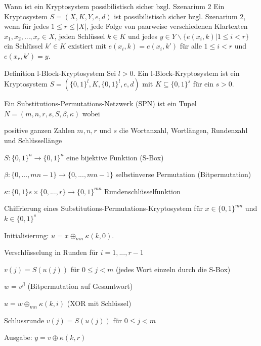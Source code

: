 \documentclass[avery5371, frame]{flashcards}
\begin{document}
\begin{flashcard}{Wann ist ein Kryptosystem possibilistisch sicher bzgl. Szenarium 2}
    Ein Kryptosystem $S=(X,K,Y,e,d)$ ist possibilistisch sicher bzgl. Szenarium 2, wenn für jedes $1 \leq r\leq |X|$, jede Folge von paarweise verschiedenen Klartexten $x_1,x_2,...,x_r\in X$, jeden Schlüssel $k\in K$ und jedes $y\in Y\backslash\{e(x_i,k)| 1 \leq i < r\}$ ein Schlüssel $k'\in K$ existiert mit $e(x_i,k)=e(x_i,k')$ für alle $1\leq i< r$ und $e(x_r,k')=y$.
\end{flashcard}

\begin{flashcard}{Definition l-Block-Kryptosystem}
    Sei $l>0$. Ein l-Block-Kryptosystem ist ein Kryptosystem $S=(\{0,1\}^l,K,\{0,1\}^l,e,d)$ mit $K\subseteq \{0,1\}^s$ für ein $s>0$.
\end{flashcard}

\begin{flashcard}{Ein Substitutions-Permutations-Netzwerk (SPN) ist ein Tupel $N=(m,n,r,s,S,\beta,\kappa)$ wobei}
    \begin{itemize*}
        \item positive ganzen Zahlen $m,n,r$ und $s$ die Wortanzahl, Wortlängen, Rundenzahl und Schlüssellänge
        \item $S:\{0,1\}^n\rightarrow\{0,1\}^n$ eine bijektive Funktion (S-Box)
        \item ${\beta}:\{0,...,mn-1\}\rightarrow\{0,...,mn-1\}$ selbstinverse Permutation (Bitpermutation)
        \item $\kappa :\{0,1\}s\times\{0,...,r\}\rightarrow\{0,1\}^{mn}$ Rundenschlüsselfunktion
    \end{itemize*}
\end{flashcard}

\begin{flashcard}[Ablauf]{Chiffrierung eines Substitutions-Permutations-Kryptosystem}
    für $x\in\{0,1\}^{mn}$ und $k\in\{0,1\}^s$
    \begin{enumerate*}
        \item Initialisierung: $u=x\oplus_{mn} \kappa (k,0)$.
        \item Verschlüsselung in Runden für $i=1,...,r-1$
        \begin{enumerate*}
            \item $v(j)=S(u(j))$ für $0\leq j<m$ (jedes Wort einzeln durch die S-Box)
            \item $w=v^{\beta}$ (Bitpermutation auf Gesamtwort)
            \item $u=w\oplus_{mn} \kappa (k,i)$ (XOR mit Schlüssel)
            \item Schlussrunde $v(j)=S(u(j))$ für $0\leq j<m$
            \item Ausgabe: $y=v\oplus \kappa (k,r)$
        \end{enumerate*}
    \end{enumerate*}
\end{flashcard}
\end{document}
